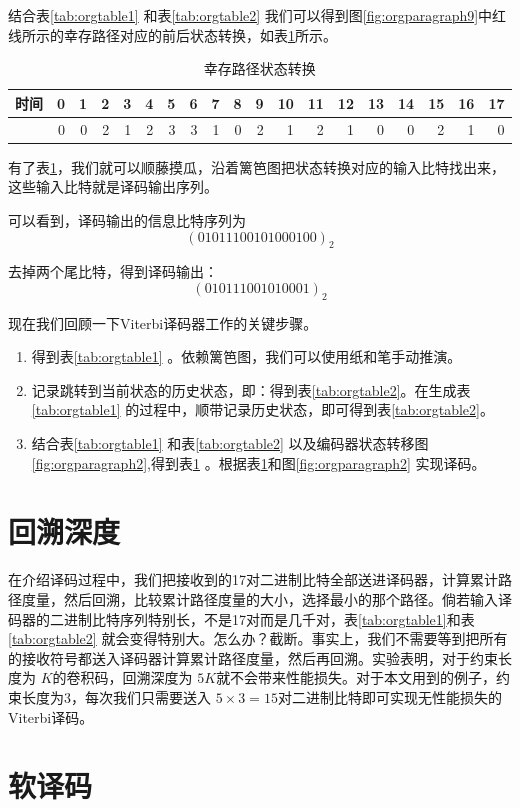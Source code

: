 \documentclass[10pt,a4paper,UTF8]{article}
\begin{document}
结合表\ref{tab:orgtable1} 和表\ref{tab:orgtable2} 我们可以得到图\ref{fig:orgparagraph9}中红线所示的幸存路径对应的前后状态转换，如表\ref{tab:orgtable3}所示。

\begin{table}[htb]
\caption{\label{tab:orgtable3}
幸存路径状态转换}
\centering
\begin{tabular}{lrrrrrrrrrrrrrrrrrr}
时间 & 0 & 1 & 2 & 3 & 4 & 5 & 6 & 7 & 8 & 9 & 10 & 11 & 12 & 13 & 14 & 15 & 16 & 17\\
\hline
 & 0 & 0 & 2 & 1 & 2 & 3 & 3 & 1 & 0 & 2 & 1 & 2 & 1 & 0 & 0 & 2 & 1 & 0\\
\end{tabular}
\end{table}

有了表\ref{tab:orgtable3}，我们就可以顺藤摸瓜，沿着篱笆图把状态转换对应的输入比特找出来，这些输入比特就是译码输出序列。

可以看到，译码输出的信息比特序列为
\begin{equation}
\label{eq:3}
(01011100101000100)_{2}
\end{equation}

去掉两个尾比特，得到译码输出：
\begin{equation}
\label{eq:4}
(010111001010001)_{2}
\end{equation}

现在我们回顾一下Viterbi译码器工作的关键步骤。
\begin{enumerate}
\item 得到表\ref{tab:orgtable1} 。依赖篱笆图，我们可以使用纸和笔手动推演。
\item 记录跳转到当前状态的历史状态，即：得到表\ref{tab:orgtable2}。在生成表\ref{tab:orgtable1} 的过程中，顺带记录历史状态，即可得到表\ref{tab:orgtable2}。
\item 结合表\ref{tab:orgtable1} 和表\ref{tab:orgtable2} 以及编码器状态转移图\ref{fig:orgparagraph2},得到表\ref{tab:orgtable3} 。根据表\ref{tab:orgtable3}和图\ref{fig:orgparagraph2} 实现译码。
\end{enumerate}
\section{回溯深度}
\label{sec:orgheadline5}


在介绍译码过程中，我们把接收到的17对二进制比特全部送进译码器，计算累计路径度量，然后回溯，比较累计路径度量的大小，选择最小的那个路径。倘若输入译码器的二进制比特序列特别长，不是17对而是几千对，表\ref{tab:orgtable1}和表\ref{tab:orgtable2} 就会变得特别大。怎么办？截断。事实上，我们不需要等到把所有的接收符号都送入译码器计算累计路径度量，然后再回溯。实验表明，对于约束长度为 \(K\)的卷积码，回溯深度为 \(5K\)就不会带来性能损失。对于本文用到的例子，约束长度为3，每次我们只需要送入 \(5\times 3=15\)对二进制比特即可实现无性能损失的Viterbi译码。

\section{软译码}
\label{sec:orgheadline6}
\end{document}
